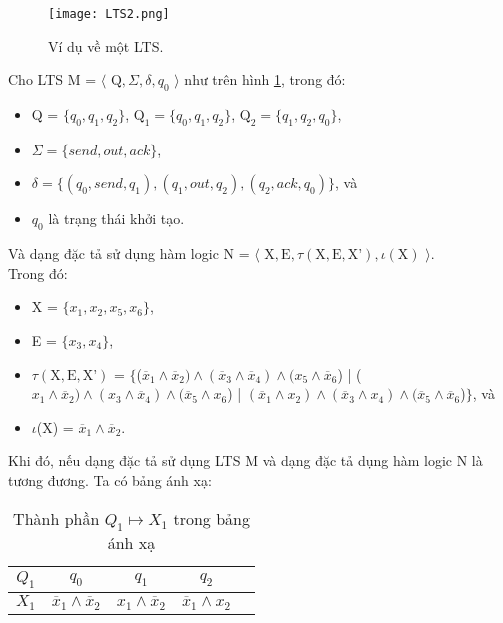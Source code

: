 \documentclass[a4paper,13pt,oneside,openany]{book}
\begin{document}
\begin{flushleft}
		\begin{figure}[h]
			\centering
			\texttt{[image: LTS2.png]}
			\caption{Ví dụ về một LTS.}
			\label{fig:LTS3}
		\end{figure}
		Cho LTS M = $\langle$ $\textrm{Q}, \Sigma, \delta, q_{0}$ $\rangle$ như trên hình \ref{fig:LTS3}, trong đó:
		\begin{itemize}
			\item Q = $\{q_0, q_1, q_2\}$, $\textrm{Q}_1 = \{q_0, q_1, q_2\}$, $\textrm{Q}_2 = \{q_1, q_2, q_0\}$,
			\item $\Sigma = \{send, out, ack\}$,
			\item $\delta = \{(q_0, send, q_1), (q_1, out, q_2), (q_2, ack, q_0)\}$, và
			\item $q_0$ là trạng thái khởi tạo.
		\end{itemize}
		Và dạng đặc tả sử dụng hàm logic N = $\langle$ $\textrm{X}, \textrm{E}, \tau(\textrm{X}, \textrm{E}, \textrm{X'}), \iota(\textrm{X})$ $\rangle$.\\
		Trong đó:
		\begin{itemize}
			\item X = $\{x_1, x_2, x_5, x_6\}$,
			\item E = $\{x_3, x_4\}$,
			\item $\tau(\textrm{X}, \textrm{E}, \textrm{X'})$ = $\{$($\overline{x}_1 \land \overline{x}_2) \land (\overline{x}_3 \land \overline{x}_4) \land (x_5 \land \overline{x}_6$) | ($x_1\land\overline{x}_2)\land (x_3\land \overline{x}_4)\land (\overline{x}_5 \land x_6$) | $(\overline{x}_1\land x_2)\land(\overline{x}_3\land x_4)\land (\overline{x}_5\land\overline{x}_6$)$\}$, và
			\item $\iota$(X) = $\overline{x}_1 \land \overline{x}_2$.
		\end{itemize}
		Khi đó, nếu dạng đặc tả sử dụng LTS M và dạng đặc tả dụng hàm logic N là tương đương. Ta có bảng ánh xạ:
		\begin{table}[!ht]
			\centering
			\renewcommand{\arraystretch}{1.25}
			\begin{tabular}{|c|c|c|c|c|}
				\hline
				$Q_1$ & $q_0$ & $q_1$ & $q_2$\\
				\hline
				$X_1$ & $\overline{x}_1 \land \overline{x}_2$ & $x_1\land\overline{x}_2$&$\overline{x}_1\land x_2$\\
				\hline
			\end{tabular}
			\caption{Thành phần $Q_1 \mapsto X_1$ trong bảng ánh xạ}
		\end{table}
		\begin{table}[!ht]

\end{table}
\end{flushleft}
\end{document}
